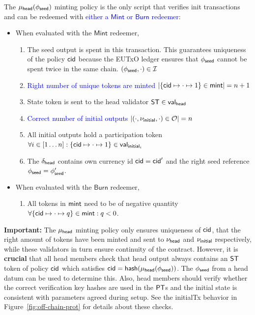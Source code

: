 \noindent The $\mu_\mathsf{head}(\phi_{\mathsf{seed}})$ minting policy is the only script that verifies
init transactions and can be redeemed with \textcolor{blue}{either a $\mathsf{Mint}$ or
	$\mathsf{Burn}$ redeemer}: %
\begin{itemize}
	\item When evaluated with the $\mathsf{Mint}$ redeemer,
	      \begin{enumerate}
		      \item The seed output is spent in this transaction. This guarantees uniqueness of the policy $\mathsf{cid}$ because the EUTxO ledger ensures that $\phi_{\mathsf{seed}}$ cannot be spent twice in the same chain.
		            $(\phi_{\mathsf{seed}}, \cdot) \in \mathcal{I}$
		      \item \textcolor{blue}{Right number of unique tokens are minted
			            $|\{\mathsf{cid} \mapsto \cdot \mapsto 1\} \in \mathsf{mint}| = n + 1$}
		      \item State token is sent to the head validator $\mathsf{ST} \in \mathsf{val}_{\mathsf{head}}$
		      \item \textcolor{blue}{Correct number of initial outputs $|(\cdot, \nu_{\mathsf{initial}}, \cdot) \in \mathcal{O}| = n$}
		      \item All initial outputs hold a participation token $\forall i \in [1 \dots n] : \{\mathsf{cid} \mapsto \cdot \mapsto 1\} \in \mathsf{val}_{\mathsf{initial}_{i}}$
		      \item The $\delta_{\mathsf{head}}$ contains own currency id $\mathsf{cid} = \mathsf{cid}'$ and the right seed reference $\phi_{\mathsf{seed}} = \phi_{\mathsf{seed}}'$.
	      \end{enumerate}
	\item When evaluated with the $\mathsf{Burn}$ redeemer,
	      \begin{enumerate}
		      \item All tokens in $\mathsf{mint}$ need to be of negative quantity
		            $\forall \{\mathsf{cid} \mapsto \cdot \mapsto q\} \in \mathsf{mint} : q < 0$.
	      \end{enumerate}
\end{itemize}

\noindent \textbf{Important:} The $\mu_\mathsf{head}$ minting policy only ensures
uniqueness of $\mathsf{cid}$, that the right amount of tokens have been minted and sent
to $\nu_\mathsf{head}$ and $\nu_{\mathsf{initial}}$ respectively, while these validators in turn
ensure continuity of the contract. However, it is \textbf{crucial} that all head
members check that head output always contains an $\mathsf{ST}$ token of policy $\mathsf{cid}$
which satisfies $\mathsf{cid} = \mathsf{hash}(\mu_\mathsf{head}(\phi_{\mathsf{seed}}))$. The $\phi_{\mathsf{seed}}$ from a head datum
can be used to determine this. Also, head members should verify whether the
correct verification key hashes are used in the $\mathsf{PT}$s and the initial state is
consistent with parameters agreed during setup. See the initialTx behavior in
Figure~\ref{fig:off-chain-prot} for details about these checks.\\

